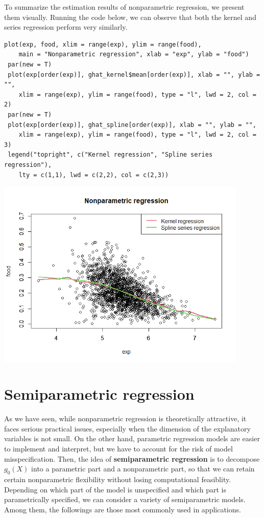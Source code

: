\documentclass[10.5pt, A4paper, openany, uplatex]{book}
\numberwithin{equation}{section}
\begin{document}
To summarize the estimation results of nonparametric regression, we present them visually.
Running the code below, we can observe that both the kernel and series regression perform very similarly.

\begin{lstlisting}[basicstyle=\ttfamily\footnotesize, frame=single]
 plot(exp, food, xlim = range(exp), ylim = range(food), 
	main = "Nonparametric regression", xlab = "exp", ylab = "food")
 par(new = T)
 plot(exp[order(exp)], ghat_kernel$mean[order(exp)], xlab = "", ylab = "",
	xlim = range(exp), ylim = range(food), type = "l", lwd = 2, col = 2)
 par(new = T)
 plot(exp[order(exp)], ghat_spline[order(exp)], xlab = "", ylab = "",
	xlim = range(exp), ylim = range(food), type = "l", lwd = 2, col = 3)
 legend("topright", c("Kernel regression", "Spline series regression"), 
	lty = c(1,1), lwd = c(2,2), col = c(2,3))
\end{lstlisting}

\begin{center}
	\includegraphics[width = 12cm]{engel.png}
\end{center}

\section{Semiparametric regression}

As we have seen, while nonparametric regression is theoretically attractive, it faces serious practical issues, especially when the dimension of the explanatory variables is not small.
On the other hand, parametric regression models are easier to implement and interpret, but we have to account for the risk of model misspecification.
Then, the idea of \textbf{semiparametric regression} is to decompose $g_0(X)$ into a parametric part and a nonparametric part, so that we can retain certain nonparametric flexibility without losing computational feasiblity.
Depending on which part of the model is unspecified and which part is parametrically specified, we can consider a variety of semiparametric models.
Among them, the followings are those most commonly used in applications.
\end{document}
